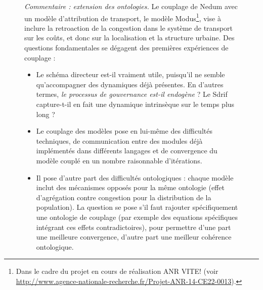 \begin{figure}
\begin{mdframed}
	\textit{Commentaire : extension des ontologies.} Le couplage de Nedum avec un modèle d'attribution de transport, le modèle Modus\footnote{Dans le cadre du projet en cours de réalisation ANR VITE! (voir \url{http://www.agence-nationale-recherche.fr/Projet-ANR-14-CE22-0013}).}, vise à inclure la retroaction de la congestion dans le système de transport sur les coûts, et donc sur la localisation et la structure urbaine. Des questions fondamentales se dégagent des premières expériences de couplage :
	\begin{itemize}
		\item Le schéma directeur est-il vraiment utile, puisqu'il ne semble qu'accompagner des dynamiques déjà présentes. En d'autres termes, \textit{le processus de gouvernance est-il endogène} ? Le Sdrif capture-t-il en fait une dynamique intrinsèque sur le temps plus long ?
		\item Le couplage des modèles pose en lui-même des difficultés techniques, de communication entre des modules déjà implémentés dans différents langages et de convergence du modèle couplé en un nombre raisonnable d'itérations.
		\item Il pose d'autre part des difficultés ontologiques : chaque modèle inclut des mécanismes opposés pour la même ontologie (effet d'agrégation contre congestion pour la distribution de la population). La question se pose s'il faut rajouter spécifiquement une ontologie de couplage (par exemple des equations spécifiques intégrant ces effets contradictoires), pour permettre d'une part une meilleure convergence, d'autre part une meilleur cohérence ontologique.
	\end{itemize}
	
	
	
	\medskip
	
	
	\end{mdframed}
\end{figure}





